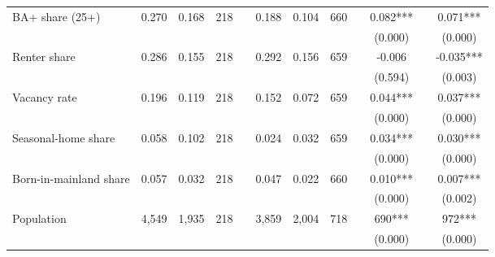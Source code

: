 \begin{table}[H]
{\begin{tabular}{lccccccccccc}
    \multicolumn{1}{l}{BA+ share (25+)} & 0.270 & 0.168 & 218 &  & 0.188 & 0.104 & 660 &  & 0.082*** &  & 0.071*** \\
 & & & & & & & & & (0.000) & & (0.000) \\
    \multicolumn{1}{l}{Renter share} & 0.286 & 0.155 & 218 &  & 0.292 & 0.156 & 659 &  & -0.006 &  & -0.035*** \\
 & & & & & & & & & (0.594) & & (0.003) \\
    \multicolumn{1}{l}{Vacancy rate} & 0.196 & 0.119 & 218 &  & 0.152 & 0.072 & 659 &  & 0.044*** &  & 0.037*** \\
 & & & & & & & & & (0.000) & & (0.000) \\
    \multicolumn{1}{l}{Seasonal-home share} & 0.058 & 0.102 & 218 &  & 0.024 & 0.032 & 659 &  & 0.034*** &  & 0.030*** \\
 & & & & & & & & & (0.000) & & (0.000) \\
    \multicolumn{1}{l}{Born-in-mainland share} & 0.057 & 0.032 & 218 &  & 0.047 & 0.022 & 660 &  & 0.010*** &  & 0.007*** \\
 & & & & & & & & & (0.000) & & (0.002) \\
    \multicolumn{1}{l}{Population} & 4,549 & 1,935 & 218 &  & 3,859 & 2,004 & 718 &  & 690*** &  & 972*** \\
 & & & & & & & & & (0.000) & & (0.000) \\
\midrule\bottomrule
\end{tabular}
}
\label{tab:balance_prcs2010}
\end{table}
